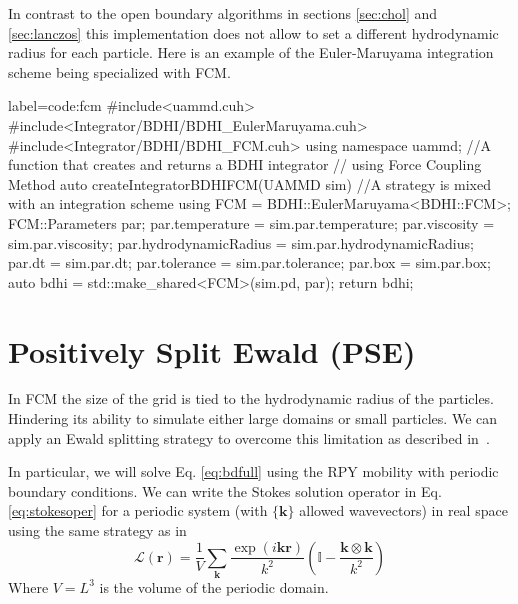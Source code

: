 \documentclass[ twoside,openright,titlepage,numbers=noenddot,%
headinclude,footinclude,cleardoublepage=empty,abstract=on,
BCOR=5mm,paper=b5,fontsize=11pt, dvipsnames
]{scrreprt}
\renewcommand{\vec}[1]{\bm{#1}}
\newcommand{\oper}[1]{\mathcal{#1}}
\newcommand{\fpos}{r}
\begin{document}
In contrast to the open boundary algorithms in sections \ref{sec:chol} and \ref{sec:lanczos} this implementation does not allow to set a different hydrodynamic radius for each particle.
Here is an example of the Euler-Maruyama integration scheme being specialized with \gls{FCM}.
\begin{code2} {label=code:fcm}
#include<uammd.cuh>
#include<Integrator/BDHI/BDHI_EulerMaruyama.cuh>
#include<Integrator/BDHI/BDHI_FCM.cuh>
using namespace uammd;
//A function that creates and returns a BDHI integrator
// using Force Coupling Method
auto createIntegratorBDHIFCM(UAMMD sim){   
  //A strategy is mixed with an integration scheme
  using FCM = BDHI::EulerMaruyama<BDHI::FCM>;
  FCM::Parameters par;
  par.temperature = sim.par.temperature;
  par.viscosity = sim.par.viscosity;
  par.hydrodynamicRadius = sim.par.hydrodynamicRadius;
  par.dt = sim.par.dt;
  par.tolerance = sim.par.tolerance;
  par.box = sim.par.box;
  auto bdhi = std::make_shared<FCM>(sim.pd, par);
  return bdhi;
}
\end{code2}

\newpage

\section{Positively Split Ewald (PSE)}\label{sec:pse}
In \gls{FCM} the size of the grid is tied to the hydrodynamic radius of the particles. Hindering its ability to simulate either large domains or small particles.
We can apply an Ewald splitting strategy to overcome this limitation as described in~\cite{Fiore2017}.

In particular, we will solve Eq. \eqref{eq:bdfull} using the \gls{RPY} mobility with periodic boundary conditions. We can write the Stokes solution operator in Eq. \eqref{eq:stokesoper} for a periodic system (with $\{\vec{k}\}$ allowed wavevectors) in real space using the same strategy as in~\cite{Hasimoto1959}
\begin{equation}
  \label{eq:psestokesoper}
  \oper{L}(\vec{\fpos}) = \frac{1}{V}\sum_{\vec{k}} \frac{\exp(i\vec{k}\vec{r})}{k^2}\left(\mathbb{I} - \frac{\vec{k}\otimes\vec{k}}{k^2}\right)
\end{equation}
Where $V = L^3$ is the volume of the periodic domain.
\end{document}
